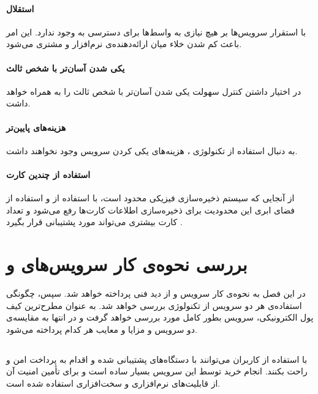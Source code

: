 \documentclass[oneside]{report}
\begin{document}
\subsubsection{استقلال}
		با استقرار سرویس‌ها بر 
		{\normalsize {}}
		هیچ نیازی به واسط‌ها برای دسترسی به 
		{\normalsize {}}
وجود ندارد. این امر باعث کم شدن خلاء میان ارائه‌دهنده‌ی نرم‌افزار و مشتری می‌شود. 

\subsubsection{یکی شدن آسان‌تر با شخص ثالث}					
در اختیار داشتن کنترل 
{\normalsize {}}			
	سهولت یکی شدن آسان‌تر با شخص ثالث را به همراه خواهد داشت.
\subsubsection{هزینه‌های پایین‌تر}				
	به دنبال استفاده از تکنولوژی
	{\normalsize {}}،
	هزینه‌های یکی‌ کردن سرویس 
	{\normalsize {}}
	وجود نخواهند داشت. 		
					
\subsubsection{استفاده از چندین کارت}
					از آنجایی که سیستم ذخیره‌سازی فیزیکی 
					{\normalsize {}}
					محدود است، با استفاده از 
					{\normalsize {}}
		و استفاده از فضای ابری این محدودیت برای ذخیره‌سازی اطلاعات کارت‌ها رفع می‌شود و تعداد کارت بیشتری می‌تواند مورد پشتیبانی قرار بگیرد
	\cite{hcese}			.

		\chapter{بررسی نحوه‌ی کار سرویس‌های   {\Large{} }  و   {\Large{} }}\label{comparison}
		در این فصل به نحوه‌ی کار سرویس 
							{\normalsize {}} 
		و 
							{\normalsize {}}
	از دید فنی پرداخته خواهد شد. سپس،  چگونگی استفاده‌ی هر دو سرویس از تکنولوژی 
						{\normalsize {}} 
	بررسی خواهد شد. به عنوان مطرح‌ترین کیف پول الکترونیکی،   سرویس 
						{\normalsize {}}
 بطور کامل مورد بررسی خواهد گرفت و در انتها به مقایسه‌ی دو سرویس و مزایا و معایب هر کدام پرداخته می‌شود.
 
 \section{{\large{}} }
	 با استفاده از
	 						{\normalsize {}}
کاربران می‌توانند با  دستگاه‌های 
{\normalsize {}}
	پشتیبانی شده و 
	{\normalsize {}}
	اقدام به پرداخت امن و راحت بکنند. 
انجام خرید توسط این سرویس بسیار ساده است و برای تأمین امنیت آن از قابلیت‌های نرم‌افزاری و سخت‌افزاری استفاده شده است.
\end{document}
